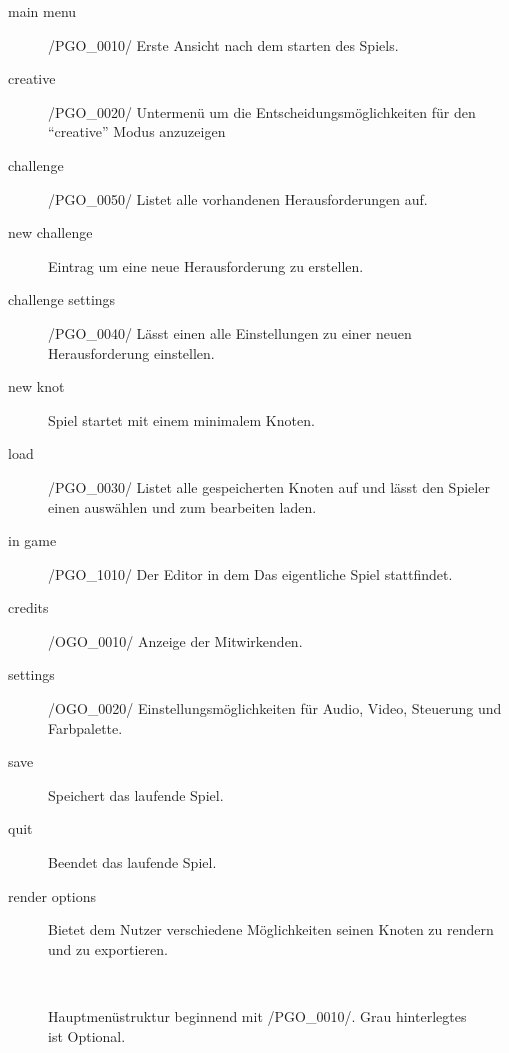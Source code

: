 	\begin{description}
		\item[main menu] /PGO\_0010/ Erste Ansicht nach dem starten des Spiels.
		\item[creative] /PGO\_0020/ Untermenü um die Entscheidungsmöglichkeiten für den "`creative"' Modus anzuzeigen
		\item[challenge] /PGO\_0050/ Listet alle vorhandenen Herausforderungen auf.
		\item[new challenge] Eintrag um eine neue Herausforderung zu erstellen.
		\item[challenge settings] /PGO\_0040/ Lässt einen alle Einstellungen zu einer neuen Herausforderung einstellen.
		\item[new knot] Spiel startet mit einem minimalem Knoten.
		\item[load] /PGO\_0030/ Listet alle gespeicherten Knoten auf und lässt den Spieler einen auswählen und zum bearbeiten laden.
		\item[in game] /PGO\_1010/ Der Editor in dem Das eigentliche Spiel stattfindet.
		\item[credits] /OGO\_0010/ Anzeige der Mitwirkenden.
		\item[settings] /OGO\_0020/ Einstellungsmöglichkeiten für Audio, Video, Steuerung und Farbpalette.
		\item[save] Speichert das laufende Spiel.
		\item[quit] Beendet das laufende Spiel.
		\item[render options] Bietet dem Nutzer verschiedene Möglichkeiten seinen Knoten zu rendern und zu exportieren.
	\end{description}
   
   ~\\
    
	\begin{figure}[h]
		\centering
	 	
	 	\caption{Hauptmenüstruktur beginnend mit /PGO\_0010/. Grau hinterlegtes ist Optional.}
	\end{figure}
	
	
